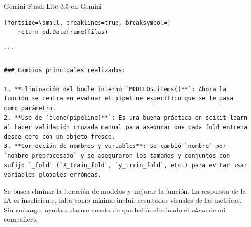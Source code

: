 \documentclass[12pt,a4paper,oneside]{book}
\begin{document}
\begin{iaresp}{Gemini Flash Lite 3.5 en Gemini}
\begin{Verbatim}[fontsize=\small, breaklines=true, breaksymbol=]
    return pd.DataFrame(filas)

```

### Cambios principales realizados:

1. **Eliminación del bucle interno `MODELOS.items()**`: Ahora la función se centra en evaluar el pipeline específico que se le pasa como parámetro.
2. **Uso de `clone(pipeline)**`: Es una buena práctica en scikit-learn al hacer validación cruzada manual para asegurar que cada fold entrena desde cero con un objeto fresco.
3. **Corrección de nombres y variables**: Se cambió `nombre` por `nombre_preprocesado` y se aseguraron los tamaños y conjuntos con sufijo `_fold` (`X_train_fold`, `y_train_fold`, etc.) para evitar usar variables globales erróneas.
\end{Verbatim}
\end{iaresp}
\begin{iaanalisis}
Se busca elminar la iteración de modelos y mejorar la función. La respuesta de la IA es insuficiente, falta como mínimo incluir resultados visuales de las métricas. Sin embargo, ayuda a darme cuenta de que había eliminado el \textit{clone} de mi compañero.
\end{iaanalisis}
\end{document}
